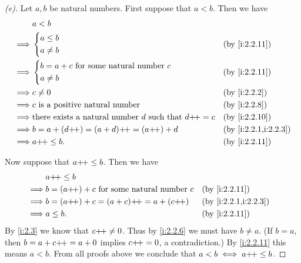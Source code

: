 \begin{proof}[(e)]
  Let \(a, b\) be natural numbers.
  First suppose that \(a < b\).
  Then we have
  \begin{align*}
             & a < b                                                                                         \\
    \implies & \begin{dcases}
                 a \leq b \\
                 a \neq b
               \end{dcases}                                                      &  & \by{i:2.2.11}          \\
    \implies & \begin{dcases}
                 b = a + c \text{ for some natural number } c \\
                 a \neq b
               \end{dcases}                     &  & \by{i:2.2.11}                                           \\
    \implies & c \neq 0                                                            &  & \by{i:2.2.2}         \\
    \implies & c \text{ is a positive natural number}                              &  & \by{i:2.2.8}         \\
    \implies & \text{there exists a natural number } d \text{ such that } d\pp = c &  & \by{i:2.2.10}        \\
    \implies & b = a + (d\pp) = (a + d)\pp = (a\pp) + d                            &  & \by{i:2.2.1,i:2.2.3} \\
    \implies & a\pp \leq b.                                                        &  & \by{i:2.2.11}
  \end{align*}

  Now suppose that \(a{+}\!{+} \leq b\).
  Then we have
  \begin{align*}
             & a\pp \leq b                                                                 \\
    \implies & b = (a\pp) + c \text{ for some natural number } c &  & \by{i:2.2.11}        \\
    \implies & b = (a\pp) + c = (a + c)\pp = a + (c\pp)          &  & \by{i:2.2.1,i:2.2.3} \\
    \implies & a \leq b.                                         &  & \by{i:2.2.11}
  \end{align*}
  By \cref{i:2.3} we know that \(c{+}\!{+} \neq 0\).
  Thus by \cref{i:2.2.6} we must have \(b \neq a\).
  (If \(b = a\), then \(b = a + c{+}\!{+} = a + 0\) implies \(c{+}\!{+} = 0\), a contradiction.)
  By \cref{i:2.2.11} this means \(a < b\).
  From all proofs above we conclude that \(a < b \iff a{+}\!{+} \leq b\).
\end{proof}

